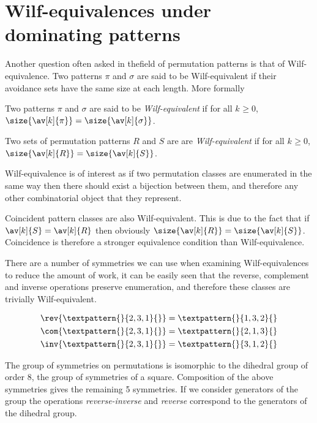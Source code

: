 \chapter{Wilf-equivalences under dominating  patterns}

Another question often asked in thefield of permutation patterns is that
of Wilf-equivalence. Two patterns \(\pi\) and \(\sigma\) are said to be
Wilf-equivalent if their avoidance sets have the same size at each
length. More formally

\begin{definition}
    Two patterns \(\pi\) and \(\sigma\) are said to be \emph{Wilf-equivalent}
    if for all \(k_{} \ge 0\), \(\size{\av[k]{\pi}} = \size{\av[k]{\sigma}}\).

    Two sets of permutation patterns \(R\) and \(S\) are are
    \emph{Wilf-equivalent} if for all \(k_{} \ge 0\),
    \(\size{\av[k]{R}} = \size{\av[k]{S}}\).
\end{definition}

Wilf-equivalence is of interest as if two permutation classes are enumerated
in the same way then there should exist a bijection between them, and therefore
any other combinatorial object that they represent.

Coincident pattern classes are also Wilf-equivalent. This is due to the fact that
if \(\av[k]{S} = \av[k]{R}\) then obviously \(\size{\av[k]{R}} = \size{\av[k]{S}}\).
Coincidence is therefore a stronger equivalence condition than Wilf-equivalence.

There are a number of symmetries we can use when examining Wilf-equivalences
to reduce the amount of work, it can be easily seen that the reverse, complement
and inverse operations preserve enumeration, and therefore these classes are trivially
Wilf-equivalent.

\begin{align*}
    \rev{\textpattern{}{2,3,1}{}} &= \textpattern{}{1,3,2}{}\\
    \com{\textpattern{}{2,3,1}{}} &= \textpattern{}{2,1,3}{}\\
    \inv{\textpattern{}{2,3,1}{}} &= \textpattern{}{3,1,2}{}
\end{align*}

The group of symmetries on permutations is isomorphic to the dihedral group
of order \(8\), the group of symmetries of a square. Composition of the above
symmetries gives the remaining 5 symmetries. If we consider generators of the
group the operations \emph{reverse-inverse} and \emph{reverse} correspond to
the generators of the dihedral group.

